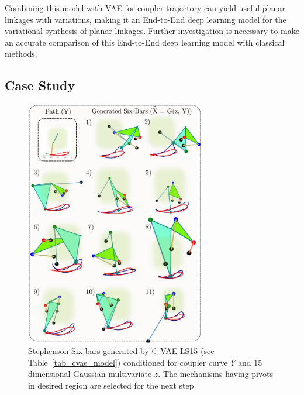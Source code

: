 Combining this model with VAE for coupler trajectory can yield useful planar linkages with variations, making it an End-to-End deep learning model for the variational synthesis of planar linkages.
Further investigation is necessary to make an accurate comparison of this End-to-End deep learning model with classical methods.


\subsection{Case Study}\label{cvae-case-study}
\begin{figure}
\centering
\includegraphics[width=0.7\textwidth]{jmd-19/figure/fig_sixbar_samples.eps}
  \caption{Stephenson Six-bars generated by C-VAE-LS15 (see Table~\ref{tab_cvae_model}) conditioned for coupler curve $Y$ and 15 dimensional Gaussian multivariate $z$. The mechanisms having pivots in desired region are selected for the next step}
\label{fig_sixbar_samples}
\end{figure}

